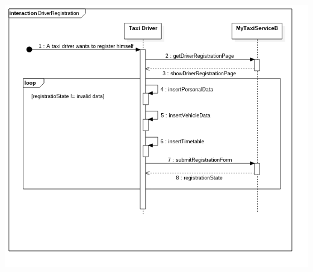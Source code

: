 \documentclass[11pt,titlepage]{article} %
\begin{document}
\begin{enumerate}
\begin{center}
		\includegraphics[scale=0.52]{usecase12.png}
		\end{center}
	\end{enumerate}
	\newpage
\end{document}
